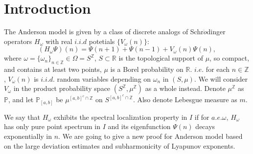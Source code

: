 \section{Introduction}
The Anderson model is given by a class of discrete analogs of Schr$\ddot{o}$dinger operators $H_{\omega}$ with real $i.i.d$ potetials $\{V_{\omega}(n)\}$:
\begin{equation}
  (H_{\omega}\Psi)(n)=\Psi(n+1)+\Psi(n-1)+V_{\omega}(n)\Psi(n),
\end{equation}
where $\omega=\{\omega_n\}_{n\in\mathbb{Z}}\in\Omega=S^{\mathbb{Z}}$, $S\subset\mathbb{R}$ is the topological support of $\mu$, so compact, and contains at least two points, $\mu$ is a Borel probability on $\mathbb{R}$. $i.e.$ for each $n\in\mathbb{Z}$, $V_{\omega} (n)$ is $i.i.d.$ random variables depending on $\omega_n$ in $(S,\mu) $. We will consider $V_\omega$ in the product probability space $ (S^{\mathbb{Z}},\mu^{\mathbb{Z}})$ as a whole instead. Denote $\mu^{\mathbb{Z}}$ as $\mathbb{P}$, and let $\mathbb{P}_{[a,b]}$ be $\mu^{[a,b]^c\cap \mathbb{Z}}$ on $S^{[a,b]^c\cap \mathbb{Z}}$.  Also denote Lebesgue measure as $m$.

We say that $H_\omega$ exhibits the spectral localization property in $I$ if for $a.e.\omega$, $H_\omega$ has only pure point spectrum in $I$ and its eigenfunction $\Psi(n)$ decays exponentially in $n$. We are going to give a new proof for Anderson model based on the large deviation estimates and subharmonicity of Lyapunov exponents.
